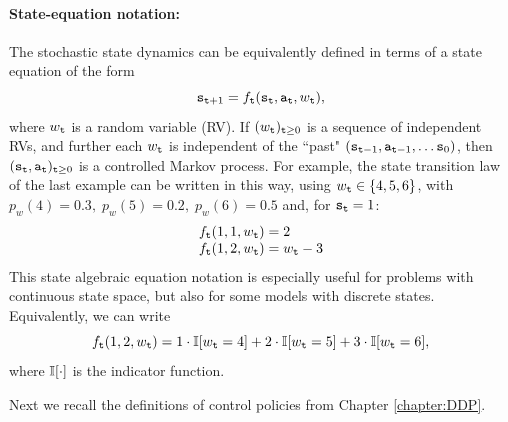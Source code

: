 \paragraph{State-equation notation:}
The stochastic state dynamics can be equivalently defined in terms of a state equation of the form
                                                   \[{{\tt s}_{{\tt t} + 1}} = {f_{\tt t}}({{\tt s}_{\tt t}},{{\tt a}_{\tt t}},{w_{\tt t}}),\]
where ${w_{\tt t}}$ is a random variable (RV).
    If  ${({w_{\tt t}})_{{\tt t} \ge 0}}$ is a sequence of independent RVs, and further each ${w_{\tt t}}$ is independent of the ``past"  $({{\tt s}_{{\tt t} - 1}},{{\tt a}_{{\tt t} - 1}}, \ldots {{\tt s}_0})$, then ${({{\tt s}_{\tt t}},{{\tt a}_{\tt t}})_{{\tt t} \ge 0}}$ is a controlled Markov process.
    For example, the state transition law of the last example can be written in this way, using
                  ${w_{\tt t}} \in \{ 4,5,6\} $,  with  ${p_w}(4) = 0.3,\;{p_w}(5) = 0.2,\;{p_w}(6) = 0.5$
and, for ${{\tt s}_{\tt t}} = 1$:
    \[\begin{array}{l}
    {f_{\tt t}}(1,1,{w_{\tt t}}) = 2\\
    {f_{\tt t}}(1,2,{w_{\tt t}}) = {w_{\tt t}} - 3
    \end{array}\]
  This state algebraic equation notation is especially useful for problems with continuous state space, but also for some models with discrete states.
Equivalently, we can write
    \[
 {f_{\tt t}}(1,2,{w_{\tt t}}) = 1\cdot \mathbb{I}[{w_{\tt t}}=4]+2\cdot \mathbb{I}[{w_{\tt t}}=5]+3\cdot \mathbb{I}[{w_{\tt t}}=6] ,
    \]
where $\mathbb{I}[\cdot]$ is the indicator function.

Next we recall the definitions of control policies from Chapter \ref{chapter:DDP}.

